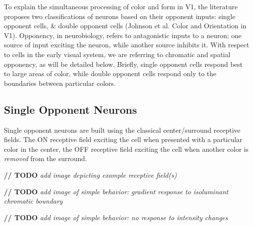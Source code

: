 \documentclass[journal,onecolumn]{IEEEtran}
\begin{document}
To explain the simultaneous processing of color and form in V1, the literature proposes two classifications of neurons based on their opponent inputs: single opponent cells, \& double opponent cells (Johnson et al. Color and Orientation in V1). Opponency, in neurobiology, refers to antagonistic inputs to a neuron; one source of input exciting the neuron, while another source inhibits it. With respect to cells in the early visual system, we are referring to chromatic and spatial opponency, as will be detailed below. Briefly, single opponent cells respond best to large areas of color, while double opponent cells respond only to the boundaries between particular colors.


\subsection*{Single Opponent Neurons}

Single opponent neurons are built using the classical center/surround receptive fields. The ON receptive field exciting the cell when presented with a particular color in the center, the OFF receptive field exciting the cell when another color is \textit{removed} from the surround.

\textbf{// TODO} \textit{add image depicting example receptive field(s)}

\textbf{// TODO} \textit{add image of simple behavior: gradient response to isoluminant chromatic boundary}

\textbf{// TODO} \textit{add image of simple behavior: no response to intensity changes}
\end{document}
